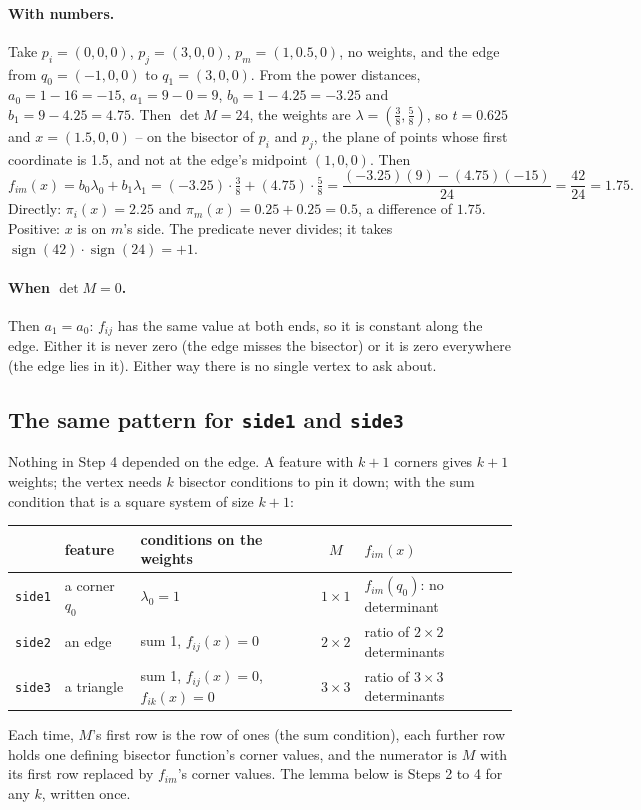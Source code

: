 \documentclass[11pt,a4paper]{article}
\newcommand{\code}[1]{\texttt{#1}}
\newcommand{\sgn}{\operatorname{sign}}
\theoremstyle{remark}
\begin{document}
\paragraph{With numbers.} Take $p_i = (0,0,0)$, $p_j = (3,0,0)$, $p_m = (1, 0.5, 0)$, no weights,
and the edge from $q_0 = (-1,0,0)$ to $q_1 = (3,0,0)$. From the power distances,
$a_0 = 1 - 16 = -15$, $a_1 = 9 - 0 = 9$, $b_0 = 1 - 4.25 = -3.25$ and $b_1 = 9 - 4.25 = 4.75$.
Then $\det M = 24$, the weights are $\lambda = (\tfrac38, \tfrac58)$, so $t = 0.625$ and
$x = (1.5, 0, 0)$ -- on the bisector of $p_i$ and $p_j$, the plane of points whose first
coordinate is 1.5, and not at the edge's midpoint $(1, 0, 0)$. Then
\[
  f_{im}(x) = b_0\lambda_0 + b_1\lambda_1
            = (-3.25)\cdot\tfrac38 + (4.75)\cdot\tfrac58
            = \frac{(-3.25)(9) - (4.75)(-15)}{24} = \frac{42}{24} = 1.75 .
\]
Directly: $\pi_i(x) = 2.25$ and $\pi_m(x) = 0.25 + 0.25 = 0.5$, a difference of $1.75$. Positive:
$x$ is on $m$'s side. The predicate never divides; it takes $\sgn(42)\cdot\sgn(24) = +1$.

\paragraph{When $\det M = 0$.} Then $a_1 = a_0$: $f_{ij}$ has the same value at both ends, so it
is constant along the edge. Either it is never zero (the edge misses the bisector) or it is zero
everywhere (the edge lies in it). Either way there is no single vertex to ask about.

\subsection{The same pattern for \texorpdfstring{\code{side1}}{side1} and \texorpdfstring{\code{side3}}{side3}}

Nothing in Step 4 depended on the edge. A feature with $k+1$ corners gives $k+1$ weights; the
vertex needs $k$ bisector conditions to pin it down; with the sum condition that is a square
system of size $k+1$:

\begin{center}
\begin{tabularx}{\linewidth}{@{}l l l c L@{}}
\toprule
 & feature & conditions on the weights & $M$ & $f_{im}(x)$ \\
\midrule
\code{side1} & a corner $q_0$ & $\lambda_0 = 1$ & $1\times1$ & $f_{im}(q_0)$: no determinant \\
\code{side2} & an edge & sum 1, $f_{ij}(x) = 0$ & $2\times2$ & ratio of $2\times2$ determinants \\
\code{side3} & a triangle & sum 1, $f_{ij}(x) = 0$, $f_{ik}(x) = 0$ & $3\times3$ & ratio of
  $3\times3$ determinants \\
\bottomrule
\end{tabularx}
\end{center}
Each time, $M$'s first row is the row of ones (the sum condition), each further row holds one
defining bisector function's corner values, and the numerator is $M$ with its first row replaced
by $f_{im}$'s corner values. The lemma below is Steps 2 to 4 for any $k$, written once.
\end{document}
